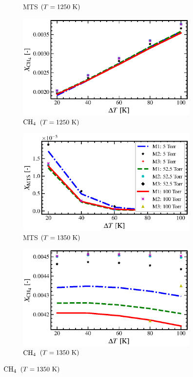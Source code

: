 \documentclass[final, letterpaper, square, comma, numbers, sort&compress]{elsarticle}
\begin{document}
\begin{figure}
\begin{subfigure}{0.49\textwidth}
        \caption{MTS $(T=1250\rm\ K)$}
    \end{subfigure}
    \begin{subfigure}{0.49\textwidth}
        \centering
        \includegraphics[width=0.99\textwidth]{dT-vs-CH4-T-1250-compare}
        \caption{$\rm CH_4$ $(T=1250\rm\ K)$}
    \end{subfigure}
    \begin{subfigure}{0.49\textwidth}
        \centering
        \includegraphics[width=0.99\textwidth]{dT-vs-MTS-T-1350-compare}
        \caption{MTS $(T=1350\rm\ K)$}
    \end{subfigure}
    \begin{subfigure}{0.49\textwidth}
        \centering
        \includegraphics[width=0.99\textwidth]{dT-vs-CH4-T-1350-compare}
        \caption{$\rm CH_4$ $(T=1350\rm\ K)$}
    \end{subfigure}


\end{figure}
\end{document}
